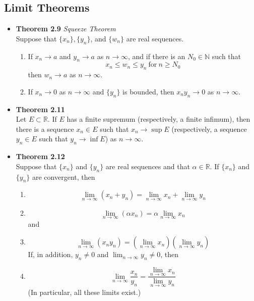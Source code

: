 \documentclass[11pt,a4paper]{article}
\begin{document}
\subsection{Limit Theorems}

\begin{itemize}
    \item \textbf{Theorem 2.9} \emph{Squeeze Theorem} \\
        Suppose that $\{x_n\}, \{y_n\}$, and $\{w_n\}$ are real sequences.
        \begin{enumerate}
            \item If $x_n \to a$ and $y_n \to a$ as $n \to \infty$,
                and if there is an $N_0 \in \mathbb{N}$ such that
                \[
                    x_n \leq w_n \leq y_n \ \text{for} \ n \geq N_0
                \]
                then $w_n \to a$ as $n \to \infty$.
            \item If $x_n \to 0$ as $n \to \infty$ and $\{y_n\}$ is bounded,
                then $x_n y_n \to 0$ as $n \to \infty$.
        \end{enumerate}

    \item \textbf{Theorem 2.11} \\
        Let $E \subset \mathbb{R}$.
        If $E$ has a finite supremum (respectively, a finite infimum),
        then there is a sequence $x_n \in E$ such that $x_n \to \sup E$
        (respectively, a sequence $y_n \in E$ such that $y_n \to \inf E$)
        as $n \to \infty$.

    \item \textbf{Theorem 2.12} \\
        Suppose that $\{x_n\}$ and $\{y_n\}$ are real sequences and that
        $\alpha \in \mathbb{R}$.
        If $\{x_n\}$ and $\{y_n\}$ are convergent, then
        \begin{enumerate}
            \item
                \[
                    \lim_{n \to \infty} (x_n + y_n) =
                    \lim_{n \to \infty} x_n + \lim_{n \to \infty} y_n
                \]
            \item
                \[
                    \lim_{n \to \infty} (\alpha x_n) = \alpha \lim_{n \to \infty} x_n
                \]
                and
            \item
                \[
                    \lim_{n \to \infty} (x_n y_n) =
                    ( \lim_{n \to \infty} x_n ) (\lim_{n \to \infty} y_n)
                \]
                If, in addition, $y_n \neq 0$ and $\lim_{n \to \infty} y_n \neq 0$, then
            \item
                \[
                    \lim_{n \to \infty} \frac{x_n}{y_n} =
                    \frac{\lim_{n \to \infty} x_n}{\lim_{n \to \infty} y_n}
                \]
                (In particular, all these limits exist.)


\end{enumerate}
\end{itemize}
\end{document}
